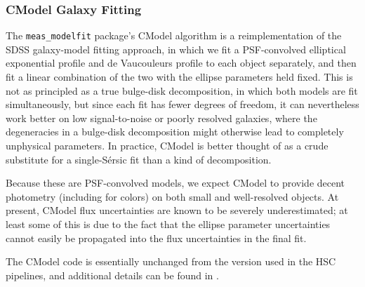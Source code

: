 \subsubsection{CModel Galaxy Fitting}
\label{sec:cmodel}

The \texttt{meas\_modelfit} package's CModel algorithm is a reimplementation of the SDSS galaxy-model fitting approach, in which we fit a PSF-convolved elliptical exponential profile and de Vaucouleurs profile to each object separately, and then fit a linear combination of the two with the ellipse parameters held fixed.
This is not as principled as a true bulge-disk decomposition, in which both models are fit simultaneously, but since each fit has fewer degrees of freedom, it can nevertheless work better on low signal-to-noise or poorly resolved galaxies, where the degeneracies in a bulge-disk decomposition might otherwise lead to completely unphysical parameters.
In practice, CModel is better thought of as a crude substitute for a single-S\'ersic fit than a kind of decomposition.

Because these are PSF-convolved models, we expect CModel to provide decent photometry (including for colors) on both small and well-resolved objects.
At present, CModel flux uncertainties are known to be severely underestimated; at least some of this is due to the fact that the ellipse parameter uncertainties cannot easily be propagated into the flux uncertainties in the final fit.

The CModel code is essentially unchanged from the version used in the HSC pipelines, and additional details can be found in \citet{2018PASJ...70S...5B}.
